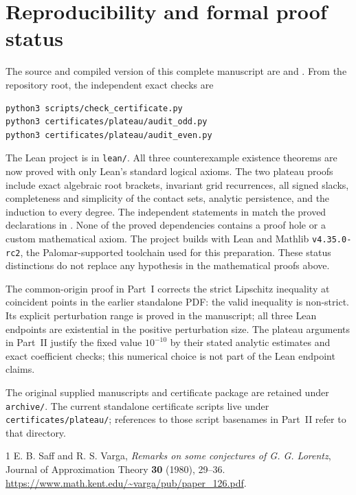 \documentclass[11pt]{article}
\theoremstyle{remark}\newtheorem{remark}[theorem]{Remark}
\begin{document}
\section{Reproducibility and formal proof status}
The source and compiled version of this complete manuscript are
 and
.
From the repository root, the independent exact checks are
\begin{verbatim}
python3 scripts/check_certificate.py
python3 certificates/plateau/audit_odd.py
python3 certificates/plateau/audit_even.py
\end{verbatim}
The Lean project is in \texttt{lean/}. All three counterexample existence
theorems are now proved with only Lean's standard logical axioms. The two
plateau proofs include exact algebraic root brackets, invariant grid
recurrences, all signed slacks, completeness and simplicity of the contact
sets, analytic persistence, and the induction to every degree. The independent
statements in  match the proved declarations in
. None of the proved dependencies contains a proof
hole or a custom mathematical axiom.
The project builds with Lean and Mathlib \texttt{v4.35.0-rc2}, the
Palomar-supported toolchain used for this preparation.
These status distinctions do not replace any hypothesis in the mathematical
proofs above.

The common-origin proof in Part~I corrects the strict Lipschitz inequality
at coincident points in the earlier standalone PDF: the valid inequality is
non-strict. Its explicit perturbation range is proved in the manuscript;
all three Lean endpoints are existential in the positive perturbation size.
The plateau arguments in Part~II justify the fixed value $10^{-10}$ by their
stated analytic estimates and exact coefficient checks; this numerical choice
is not part of the Lean endpoint claims.

The original supplied manuscripts and certificate package are retained
under \texttt{archive/}. The current standalone certificate scripts live
under \texttt{certificates/plateau/}; references to those script basenames
in Part~II refer to that directory.

\begin{thebibliography}{1}
 E. B. Saff and R. S. Varga,
\emph{Remarks on some conjectures of G. G. Lorentz},
Journal of Approximation Theory \textbf{30} (1980), 29--36.
\url{https://www.math.kent.edu/~varga/pub/paper_126.pdf}.
\end{thebibliography}
\end{document}
